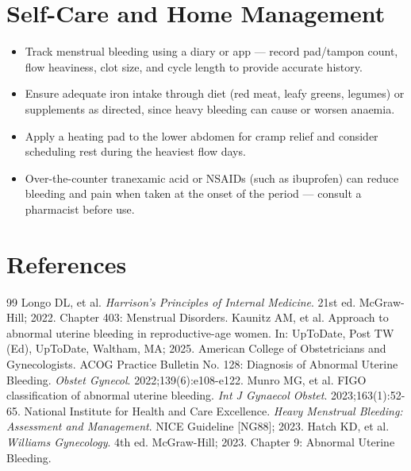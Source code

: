 \section*{Self-Care and Home Management}
\begin{itemize}
  \item Track menstrual bleeding using a diary or app — record pad/tampon count, flow heaviness, clot size, and cycle length to provide accurate history.
  \item Ensure adequate iron intake through diet (red meat, leafy greens, legumes) or supplements as directed, since heavy bleeding can cause or worsen anaemia.
  \item Apply a heating pad to the lower abdomen for cramp relief and consider scheduling rest during the heaviest flow days.
  \item Over-the-counter tranexamic acid or NSAIDs (such as ibuprofen) can reduce bleeding and pain when taken at the onset of the period — consult a pharmacist before use.
\end{itemize}

\section*{References}

\begin{thebibliography}{99}
 Longo DL, et al. \emph{Harrison's Principles of Internal Medicine}. 21st ed. McGraw-Hill; 2022. Chapter 403: Menstrual Disorders.
 Kaunitz AM, et al. Approach to abnormal uterine bleeding in reproductive-age women. In: UpToDate, Post TW (Ed), UpToDate, Waltham, MA; 2025.
 American College of Obstetricians and Gynecologists. ACOG Practice Bulletin No. 128: Diagnosis of Abnormal Uterine Bleeding. \emph{Obstet Gynecol}. 2022;139(6):e108-e122.
 Munro MG, et al. FIGO classification of abnormal uterine bleeding. \emph{Int J Gynaecol Obstet}. 2023;163(1):52-65.
 National Institute for Health and Care Excellence. \emph{Heavy Menstrual Bleeding: Assessment and Management}. NICE Guideline [NG88]; 2023.
 Hatch KD, et al. \emph{Williams Gynecology}. 4th ed. McGraw-Hill; 2023. Chapter 9: Abnormal Uterine Bleeding.
\end{thebibliography}
